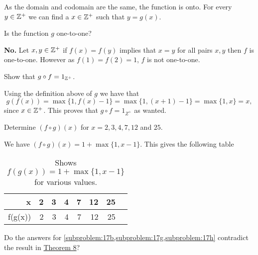 \documentclass[a4paper, english, 12pt]{article} %
\begin{document}
\begin{answer}
  As the domain and codomain are the same, the function is onto. For every $y
  \in \mathbb{Z}^+$ we can find a $x \in \mathbb{Z}^+$ such that $y = g(x)$.
\end{answer}

\begin{subproblem}
  Is the function $g$ one-to-one?
\end{subproblem} 

\begin{answer}
  \textbf{No.} Let $x, y \in \mathbb{Z}^+$ if $f(x) = f(y)$ implies that $x = y$ for
  all pairs $x,y$ then $f$ is one-to-one. However as $f(1) = f(2) = 1$, $f$
  is not one-to-one.
\end{answer}

\begin{subproblem}
  \label{subproblem:17g}
  Show that $g \circ f = 1_{\mathbb{Z}^+}$.
\end{subproblem}

\begin{answer}
  Using the definition above of $g$ we have that
  \begin{equation*}
    g(f(x)) = \max\{1 ,f(x) - 1\} = \max\{1, (x+1)-1\} = \max\{1,x\} = x,
  \end{equation*}
  since $x \in \mathbb{Z}^+$. This proves that $g \circ f = 1_{Z^+}$ as wanted.
\end{answer}

\begin{subproblem}
  \label{subproblem:17h}
  Determine $(f \circ g)(x)$ for $x = 2, 3, 4, 7, 12$ and $25$.
\end{subproblem} 

\begin{answer}
  We have $(f \circ g)(x) = 1 + \max\{1, x - 1\}$. This gives the following table
\end{answer}

\begin{table}[htbp!]
  \centering
  \caption{Shows $f(g(x)) = 1 + \max\{1, x - 1\}$ for various values.}
  \begin{tabular}{R | *{7}{R}}
    \toprule
    x \phantom{1.}  & 2 & 3 & 4 & 7 & 12 & 25 \\
    \midrule
    f(g(x)) & 2 & 3 & 4 & 7 & 12 & 25 \\
    \bottomrule
  \end{tabular}
\end{table}

\begin{subproblem}
  Do the answers for \cref{subproblem:17b,subproblem:17g,subproblem:17h} contradict the result in
  \hyperlink{thm:8}{Theorem 8}?
\end{subproblem} 
\end{document}
